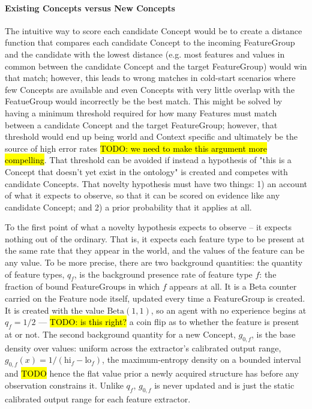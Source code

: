 \documentclass{article}
\begin{document}
\paragraph{Existing Concepts versus New Concepts}
The intuitive way to score each candidate Concept would be to create a distance function that compares each candidate Concept to the incoming FeatureGroup and the candidate with the lowest distance (e.g. most features and values in common between the candidate Concept and the target FeatureGroup) would win that match; however, this leads to wrong matches in cold-start scenarios where few Concepts are available and even Concepts with very little overlap with the FeatueGroup would incorrectly be the best match. This might be solved by having a minimum threshold required for how many Features must match between a candidate Concept and the target FeatureGroup; however, that threshold would end up being world and Context specific and ultimately be the source of high error rates \hl{TODO: we need to make this argument more compelling}. That threshold can be avoided if instead a hypothesis of "this is a Concept that doesn't yet exist in the ontology" is created and competes with candidate Concepts. That novelty hypothesis must have two things: 1) an account of what it expects to observe, so that it can be scored on evidence like any candidate Concept; and 2) a prior probability that it applies at all.

To the first point of what a novelty hypothesis expects to observe -- it expects nothing out of the ordinary. That is, it expects each feature type to be present at the same rate that they appear in the world, and the values of the feature can be any value. To be more precise, there are two background quantities: the quantity of feature types, $q_f$, is the background presence rate of feature type $f$: the fraction of bound FeatureGroups in which $f$ appears at all. It is a Beta counter carried on the Feature node itself, updated every time a FeatureGroup is created. It is created with the value $\mathrm{Beta}(1,1)$, so an agent with no experience begins at $q_f = 1/2$ --- \hl{TODO: is this right?} a coin flip as to whether the feature is present at or not. The second background quantity for a new Concept, $g_{0,f}$, is the base density over values: uniform across the extractor's calibrated output range, $g_{0,f}(x) = 1/(\mathrm{hi}_f - \mathrm{lo}_f)$, the maximum-entropy density on a bounded interval and \hl{TODO} hence the flat value prior a newly acquired structure has before any observation constrains it. Unlike $q_f$, $g_{0,f}$ is never updated and is just the static calibrated output range for each feature extractor.
\end{document}
